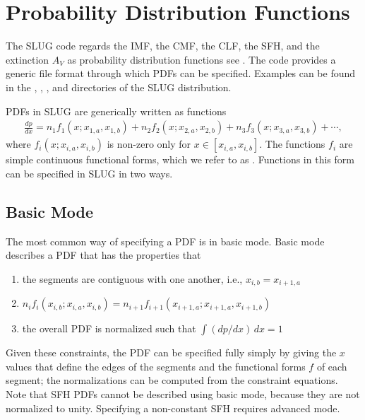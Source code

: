 \documentclass[letterpaper,10pt,english]{sphinxmanual}
\begin{document}
\chapter{Probability Distribution Functions}
\label{\detokenize{pdfs:probability-distribution-functions}}\label{\detokenize{pdfs::doc}}\label{\detokenize{pdfs:sec-pdfs}}
The SLUG code regards the IMF, the CMF, the CLF, the SFH, and the extinction \(A_V\) as probability distribution functions \textendash{} see {\hyperref[\detokenize{intro:ssec-slugpdfs}]{}}. The code provides a generic file format through which PDFs can be specified. Examples can be found in the , , , and  directories of the SLUG distribution.

PDFs in SLUG are generically written as functions
\begin{equation*}
\begin{split}\frac{dp}{dx} = n_1 f_1(x; x_{1,a}, x_{1,b}) + n_2 f_2(x; x_{2,a}, x_{2,b}) + n_3 f_3(x; x_{3,a}, x_{3,b}) + \cdots,\end{split}
\end{equation*}
where \(f_i(x; x_{i,a}, x_{i,b})\) is non-zero only for \(x \in [x_{i,a}, x_{i,b}]\). The functions \(f_i\) are simple continuous functional forms, which we refer to as . Functions in this form can be specified in SLUG in two ways.


\section{Basic Mode}
\label{\detokenize{pdfs:basic-mode}}
The most common way of specifying a PDF is in basic mode. Basic mode describes a PDF that has the properties that
\begin{enumerate}
\item {} 
the segments are contiguous with one another, i.e., \(x_{i,b} = x_{i+1,a}\)

\item {} 
\(n_i f_i(x_{i,b}; x_{i,a}, x_{i,b}) = n_{i+1} f_{i+1}(x_{i+1,a}; x_{i+1,a}, x_{i+1,b})\)

\item {} 
the overall PDF is normalized such that \(\int (dp/dx)\, dx = 1\)

\end{enumerate}

Given these constraints, the PDF can be specified fully simply by giving the \(x\) values that define the edges of the segments and the functional forms \(f\) of each segment; the normalizations can be computed from the constraint equations. Note that SFH PDFs cannot be described using basic mode, because they are not normalized to unity. Specifying a non-constant SFH requires advanced mode.
\end{document}
